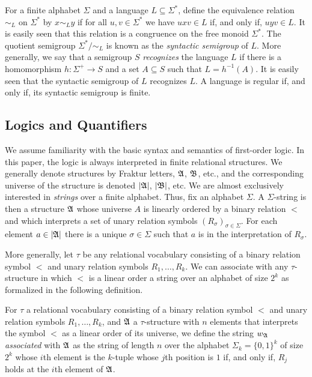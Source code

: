 \documentclass[a4paper,UKenglish,cleveref, autoref, thm-restate, anonymous]{lipics-v2021}
\begin{document}
For a finite alphabet $\Sigma$ and a language $L \subseteq \Sigma^*$, define the equivalence relation $\sim_L$ on $\Sigma^*$ by $x \sim_L y$ if for all $u,v \in \Sigma^*$ we have $uxv \in L$ if, and only if, $uyv \in L$.  It is easily seen that this relation is a congruence on the free monoid $\Sigma^*$.  The quotient semigroup $\Sigma^*/\sim_L$ is known as the \emph{syntactic semigroup} of $L$.  More generally, we say that a semigroup $S$ \emph{recognizes} the language $L$ if there is a homomorphism $h: \Sigma^+ \rightarrow S$ and a set $A \subseteq S$ such that $L = h^{-1}(A)$.  It is easily seen that the syntactic semigroup of $L$ recognizes $L$.  A language is regular if, and only if, its syntactic semigroup is finite.

\subsection{Logics and Quantifiers}\label{sec:backgroundmult}

We assume familiarity with the basic syntax and semantics of first-order logic.  In this paper, the logic is always interpreted in finite relational structures.  We generally denote structures by Fraktur letters, $\mathfrak{A}$, $\mathfrak{B}$, etc., and the corresponding universe of the structure is denoted $|\mathfrak{A}|$, $|\mathfrak{B}|$, etc.
We are almost exclusively interested in \emph{strings} over a finite alphabet.  Thus, fix an alphabet $\Sigma$.  A $\Sigma$-string is then a structure $\mathfrak{A}$ whose universe $A$ is linearly ordered by a binary relation $<$ and which interprets a set of unary relation symbols $(R_{\sigma})_{\sigma \in \Sigma}$.  For each element $a \in |\mathfrak{A}|$ there is a unique $\sigma \in \Sigma$ such that $a$ is in the interpretation of $R_{\sigma}$.

More generally, let $\tau$ be any relational vocabulary consisting of a binary relation symbol $<$ and unary relation symbols $R_1,\ldots,R_k$.  We can associate with any $\tau$-structure in which $<$ is a linear order a string over an alphabet of size $2^k$ as formalized in the following definition.
\begin{definition}\label{def:associated}
  For $\tau$ a relational vocabulary consisting of a binary relation symbol $<$ and unary relation symbols $R_1,\ldots,R_k$, and $\mathfrak{A}$ a $\tau$-structure with $n$ elements that interprets the symbol $<$ as a linear order of its universe, we define the string $w_{\mathfrak{A}}$ \emph{associated} with $\mathfrak{A}$ as the string of length $n$ over the alphabet $\Sigma_k = \{0,1\}^k$ of size $2^k$ whose $i$th element is the $k$-tuple whose $j$th position is $1$ if, and only if, $R_j$ holds at the $i$th element of $\mathfrak{A}$.
\end{definition}
\end{document}
